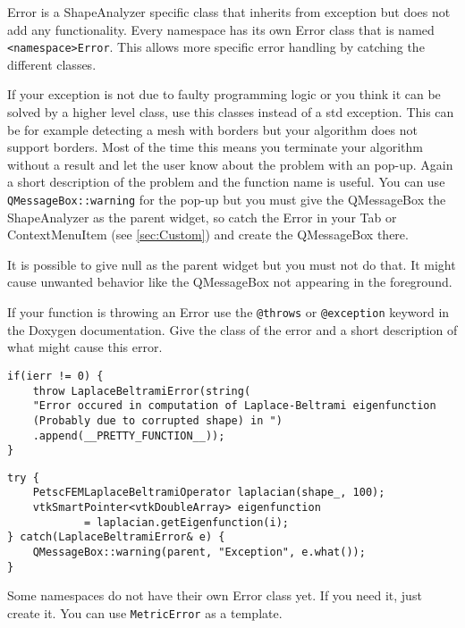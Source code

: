 Error is a ShapeAnalyzer specific class that inherits from exception but does not add any functionality. Every namespace has its own Error class that is named \texttt{<namespace>Error}. This allows more specific error handling by catching the different classes. 

If your exception is not due to faulty programming logic or you think it can be solved by a higher level class, use this classes instead of a std exception. This can be for example detecting a mesh with borders but your algorithm does not support borders. Most of the time this means you terminate your algorithm without a result and let the user know about the problem with an pop-up. Again a short description of the problem and the function name is useful. You can use \texttt{QMessageBox::warning} for the pop-up but you must give the QMessageBox the ShapeAnalyzer as the parent widget, so catch the Error in your Tab or ContextMenuItem (see \ref{sec:Custom}) and create the QMessageBox there.  
\begin{mdframed}
It is possible to give null as the parent widget but you must not do that. It might cause unwanted behavior like the QMessageBox not appearing in the foreground.
\end{mdframed}

If your function is throwing an Error use the \texttt{@throws} or \texttt{@exception} keyword in the Doxygen documentation. Give the class of the error and a short description of what might cause this error. 

\begin{lstlisting}[style=lstStyleCpp]
if(ierr != 0) {
    throw LaplaceBeltramiError(string(
    "Error occured in computation of Laplace-Beltrami eigenfunction 
    (Probably due to corrupted shape) in ")
    .append(__PRETTY_FUNCTION__));
}
\end{lstlisting}

\begin{lstlisting}[style=lstStyleCpp]
try {
    PetscFEMLaplaceBeltramiOperator laplacian(shape_, 100);
    vtkSmartPointer<vtkDoubleArray> eigenfunction 
    		= laplacian.getEigenfunction(i);
} catch(LaplaceBeltramiError& e) {
    QMessageBox::warning(parent, "Exception", e.what());
}
\end{lstlisting}

\begin{mdframed}
Some namespaces do not have their own Error class yet. If you need it, just create it. You can use \texttt{MetricError} as a template. 
\end{mdframed}

